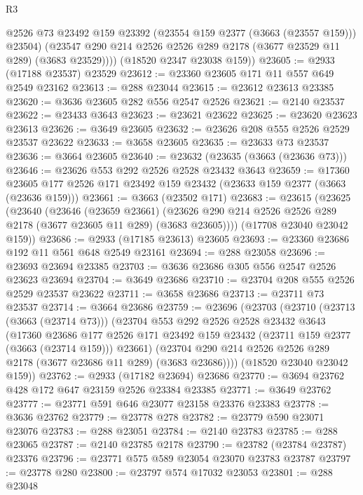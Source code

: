 \begin{lexlean}{R3}
\begin{coremodule}
            @2526
            @73
            @23492
            @159
            @23392
            (@23554 @159 @2377 (@3663 (@23557 @159)))
            @23504)
          (@23547 @290 @214 @2526 @2526 @289 @2178 (@3677 @23529 @11 @289) (@3683 @23529))))
      (@18520 @2347 @23038 @159))
@23605 := @2933 (@17188 @23537) @23529
@23612 := @23360 @23605 @171 @11 @557 @649 @2549 @23162
@23613 := @288 @23044
@23615 := @23612 @23613 @23385
@23620 := @3636 @23605 @282 @556 @2547 @2526
@23621 := @2140 @23537
@23622 := @23433 @3643
@23623 := @23621 @23622
@23625 := @23620 @23623 @23613
@23626 := @3649 @23605
@23632 := @23626 @208 @555 @2526 @2529 @23537 @23622
@23633 := @3658 @23605
@23635 := @23633 @73 @23537
@23636 := @3664 @23605
@23640 := @23632 (@23635 (@3663 (@23636 @73)))
@23646 := @23626 @553 @292 @2526 @2528 @23432 @3643
@23659 := @17360 @23605 @177 @2526 @171 @23492 @159 @23432 (@23633 @159 @2377 (@3663 (@23636 @159)))
@23661 := @3663 (@23502 @171)
@23683 := @23615
    (@23625
      (@23640
        (@23646
          (@23659 @23661)
          (@23626 @290 @214 @2526 @2526 @289 @2178 (@3677 @23605 @11 @289) (@3683 @23605))))
      (@17708 @23040 @23042 @159))
@23686 := @2933 (@17185 @23613) @23605
@23693 := @23360 @23686 @192 @11 @561 @648 @2549 @23161
@23694 := @288 @23058
@23696 := @23693 @23694 @23385
@23703 := @3636 @23686 @305 @556 @2547 @2526 @23623 @23694
@23704 := @3649 @23686
@23710 := @23704 @208 @555 @2526 @2529 @23537 @23622
@23711 := @3658 @23686
@23713 := @23711 @73 @23537
@23714 := @3664 @23686
@23759 := @23696
    (@23703
      (@23710
        (@23713 (@3663 (@23714 @73)))
        (@23704
          @553
          @292
          @2526
          @2528
          @23432
          @3643
          (@17360
            @23686
            @177
            @2526
            @171
            @23492
            @159
            @23432
            (@23711 @159 @2377 (@3663 (@23714 @159)))
            @23661)
          (@23704 @290 @214 @2526 @2526 @289 @2178 (@3677 @23686 @11 @289) (@3683 @23686))))
      (@18520 @23040 @23042 @159))
@23762 := @2933 (@17182 @23694) @23686
@23770 := @3694 @23762 @428 @172 @647 @23159 @2526 @23384 @23385
@23771 := @3649 @23762
@23777 := @23771 @591 @646 @23077 @23158 @23376 @23383
@23778 := @3636 @23762
@23779 := @23778 @278
@23782 := @23779 @590 @23071 @23076
@23783 := @288 @23051
@23784 := @2140 @23783
@23785 := @288 @23065
@23787 := @2140 @23785 @2178
@23790 := @23782 (@23784 @23787) @23376
@23796 := @23771 @575 @589 @23054 @23070 @23783 @23787
@23797 := @23778 @280
@23800 := @23797 @574 @17032 @23053
@23801 := @288 @23048

\end{coremodule}
\end{lexlean}

